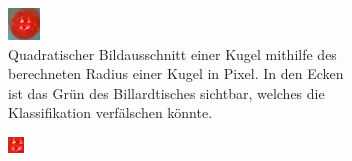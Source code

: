 \begin{figure}[h!]
    \centering
    \begin{subfigure}[t]{0.3\textwidth}
        \centering
        \includegraphics[width=1.0\linewidth]{../common/03_billiard_ai/resources/classification/radius_full.png}
        \caption{
            Quadratischer Bildausschnitt einer Kugel mithilfe des berechneten Radius einer Kugel in Pixel.
            In den Ecken ist das Grün des Billardtisches sichtbar, welches die Klassifikation verfälschen könnte.
        }
        \label{fig:klassifikation_radius_full}
    \end{subfigure}
    \begin{subfigure}[t]{0.3\textwidth}
        \centering
        \includegraphics[width=1.0\linewidth]{../common/03_billiard_ai/resources/classification/radius_reduced.png}

\end{subfigure}
\end{figure}
